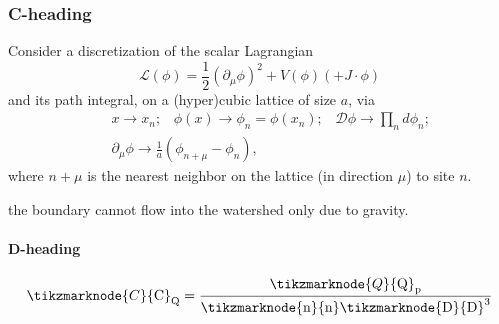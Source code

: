 \subsubsection{C-heading}
\lipsum[5]

Consider a discretization of the scalar Lagrangian
\begin{equation}
\mathcal{L}(\phi)=\frac{1}{2}(\partial_\mu\phi)^2+V(\phi)(+J\cdot
\phi)\label{ch63:eqn63.1}
\end{equation}
and its path integral, on a (hyper)cubic lattice of size $a$, via
\begin{eqnarray}
&&x\rightarrow x_n;\;\;\; \phi(x)\rightarrow \phi_n=\phi(x_n);\;\;\;
\mathcal{D}\phi\rightarrow \prod_n d\phi_n;\nonumber\\
&&\partial_\mu\phi\rightarrow
\frac{1}{a}(\phi_{n+\mu}-\phi_n),\label{ch63:eqn63.2}
\end{eqnarray}
where $n+\mu$ is the nearest neighbor on the lattice (in direction
$\mu$) to site $n$.

\lipsum[5] the boundary cannot flow into the
watershed only due to gravity.

\paragraph{D-heading}
\lipsum[5]

\bigskip

\begin{equation}
\label{ch05:eqn5.9}
\tikzmarknode{C}{\mathrm{C}}_\mathrm{Q} = \frac{\tikzmarknode{Q}{\mathrm{Q}}_\mathrm{p}}{\mathrm{\tikzmarknode{n}{\mathrm{n}}\tikzmarknode{D}{D}}^3}
\end{equation}

\bigskip\smallskip


